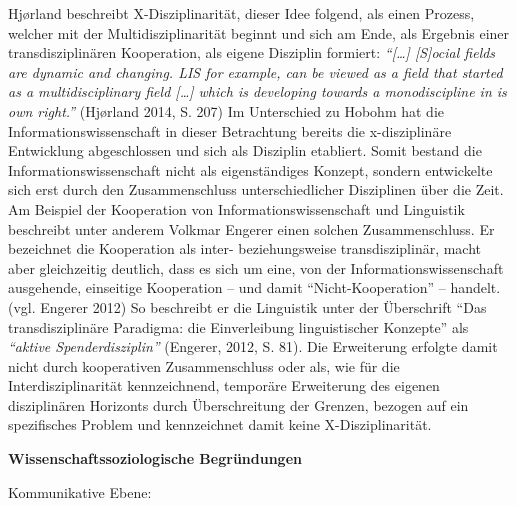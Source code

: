 \documentclass[a4paper,
fontsize=11pt,
oneside,
numbers=noperiodatend,
parskip=half-,
bibliography=totoc,
final
]{scrartcl}
\begin{document}
Hjørland beschreibt X-Disziplinarität, dieser Idee folgend, als einen
Prozess, welcher mit der Multidisziplinarität beginnt und sich am Ende,
als Ergebnis einer transdisziplinären Kooperation, als eigene Disziplin
formiert: \emph{\enquote{{[}\ldots{}{]} {[}S{]}ocial fields are dynamic
and changing. LIS for example, can be viewed as a field that started as
a multidisciplinary field {[}\ldots{}{]} which is developing towards a
monodiscipline in is own right.}} (Hjørland 2014, S. 207) Im Unterschied
zu Hobohm hat die Informationswissenschaft in dieser Betrachtung bereits
die x-disziplinäre Entwicklung abgeschlossen und sich als Disziplin
etabliert. Somit bestand die Informationswissenschaft nicht als
eigenständiges Konzept, sondern entwickelte sich erst durch den
Zusammenschluss unterschiedlicher Disziplinen über die Zeit. Am Beispiel
der Kooperation von Informationswissenschaft und Linguistik beschreibt
unter anderem Volkmar Engerer einen solchen Zusammenschluss. Er
bezeichnet die Kooperation als inter- beziehungsweise transdisziplinär,
macht aber gleichzeitig deutlich, dass es sich um eine, von der
Informationswissenschaft ausgehende, einseitige Kooperation -- und damit
\enquote{Nicht-Kooperation} -- handelt. (vgl. Engerer 2012) So
beschreibt er die Linguistik unter der Überschrift \enquote{Das
transdisziplinäre Paradigma: die Einverleibung linguistischer Konzepte}
als \emph{\enquote{aktive Spenderdisziplin}} (Engerer, 2012, S. 81). Die
Erweiterung erfolgte damit nicht durch kooperativen Zusammenschluss oder
als, wie für die Interdisziplinarität kennzeichnend, temporäre
Erweiterung des eigenen disziplinären Horizonts durch Überschreitung der
Grenzen, bezogen auf ein spezifisches Problem und kennzeichnet damit
keine X-Disziplinarität.

\textbf{Wissenschaftssoziologische Begründungen}

Kommunikative Ebene:
\end{document}
